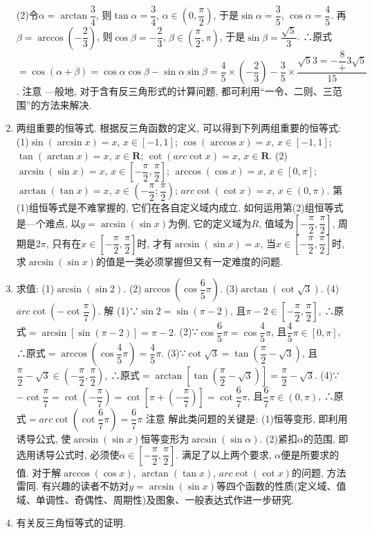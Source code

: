 \documentclass[10pt,a4paper]{article}
\begin{document}
\begin{enumerate}[1.]
(2)令$\alpha =\arctan \dfrac 34$, 则$\tan \alpha =\dfrac 34$, $\alpha \in (0,\dfrac{\pi }2)$, 于是$\sin \alpha =\dfrac 35$, $\cos \alpha =\dfrac 45$.
再$\beta =\arccos (-\dfrac 23)$, 则$\cos \beta =-\dfrac 23$, $\beta \in (\dfrac{\pi }2,\pi)$, 于是$\sin \beta =\dfrac{\sqrt 5}3$.
∴原式$=\cos (\alpha +\beta)=\cos \alpha \cos \beta -\sin \alpha \sin \beta =\dfrac 45\times (-\dfrac 23)-\dfrac 35\times \dfrac{\sqrt 53=-\dfrac 8+3\sqrt 5}{15}$.
注意  —般地, 对于含有反三角形式的计算问题, 都可利用``一令、二则、三范围''的方法来解决.
\item 两组重要的恒等式.
根据反三角函数的定义, 可以得到下列两组重要的恒等式:
(1)$\sin (\arcsin x)=x$, $x\in [-1,1]$; $\cos (\arccos x)=x$, $x\in [-1,1]$; $\tan (\arctan x)=x$, $x\in \mathbf{R}$; $\cot (arc\cot x)=x$, $x\in \mathbf{R}$.
(2)$\arcsin (\sin x)=x$, $x\in [-\dfrac{\pi }2,\dfrac{\pi }2]$; $\arccos (\cos x)=x$, $x\in [0,\pi]$; $\arctan (\tan x)=x$, $x\in (-\dfrac{\pi }2;\dfrac{\pi }2)$; $arc\cot (\cot x)=x$, $x\in (0,\pi)$.
第(1)组恒等式是不难掌握的, 它们在各自定义域内成立.
如何运用第(2)组恒等式是—个难点, 以$y=\arcsin (\sin x)$为例, 它的定义域为$R$, 值域为$[-\dfrac{\pi }2,\dfrac{\pi }2]$, 周期是$2\pi$, 只有在$x\in [-\dfrac{\pi }2,\dfrac{\pi }2]$时, 才有$\arcsin (\sin x)=x$, 当$x\in [-\dfrac{\pi }2,\dfrac{\pi }2]$时, 求$\arcsin (\sin x)$的值是一类必须掌握但又有一定难度的问题.
\item 求值:
(1)$\arcsin (\sin 2)$.						(2)$\arccos (\cos \dfrac 65\pi)$.
(3)$\arctan (\cot \sqrt 3)$.						(4)$arc\cot (-\cot \dfrac{\pi }7)$.
解  (1)∵$\sin 2=\sin (\pi -2)$, 且$\pi -2\in [-\dfrac{\pi }2,\dfrac{\pi }2]$,
∴原式$=\arcsin [\sin (\pi -2)]=\pi -2$.
(2)∵$\cos \dfrac 65\pi =\cos \dfrac 45\pi$, 且$\dfrac 45\pi \in [0,\pi]$, ∴原式$=\arccos (\cos \dfrac 45\pi)=\dfrac 45\pi$.
(3)∵$\cot \sqrt 3=\tan (\dfrac{\pi }2-\sqrt 3)$, 且$\dfrac{\pi }2-\sqrt 3\in (-\dfrac{\pi }2,\dfrac{\pi }2)$,
∴原式$=\arctan [\tan (\dfrac{\pi }2-\sqrt 3)]=\dfrac{\pi }2-\sqrt 3$.
(4)∵$-\cot \dfrac{\pi }7=\cot (-\dfrac{\pi }7)=\cot [\pi +(-\dfrac{\pi }7)]=\cot \dfrac 67\pi$, 且$\dfrac 67\pi \in (0,\pi)$,
∴原式$=arc\cot (\cot \dfrac 67\pi)=\dfrac 67\pi$
注意  解此类问题的关键是:
(1)恒等变形, 即利用诱导公式, 使$\arcsin (\sin x)$恒等变形为$\arcsin (\sin \alpha)$.
(2)紧扣$\alpha$的范围, 即选用诱导公式时, 必须使$\alpha \in [-\dfrac{\pi }2,\dfrac{\pi }2]$.
满足了以上两个要求, $\alpha$便是所要求的值.
对于解$\arccos (\cos x)$, $\arctan (\tan x)$, $arc\cot (\cot x)$的问题, 方法雷同.
有兴趣的读者不妨对$y=\arcsin (\sin x)$等四个函数的性质(定义域、值域、单调性、奇偶性、周期性)及图象、一般表达式作进一步研究.
\item 有关反三角恒等式的证明.

\end{enumerate}
\end{document}
